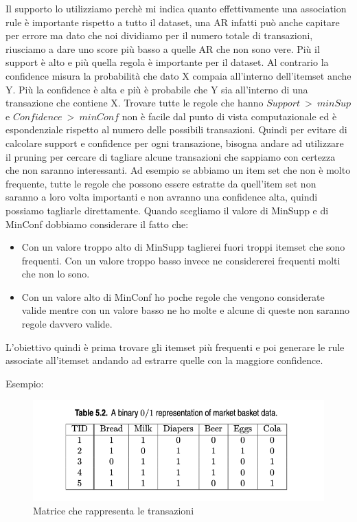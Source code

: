 \documentclass[14pt]{extreport}
\begin{document}
Il supporto lo utilizziamo perchè mi indica quanto effettivamente una association rule è importante rispetto a tutto il dataset, una AR infatti può anche capitare per errore ma dato che noi dividiamo per il numero totale di transazioni, riusciamo a dare uno score più basso a quelle AR che non sono vere. Più il support è alto e più quella regola è importante per il dataset.
Al contrario la confidence misura la probabilità che dato X compaia all'interno dell'itemset anche Y. Più la confidence è alta e più è probabile che Y sia all'interno di una transazione che contiene X.
Trovare tutte le regole che hanno $Support\ > \ minSup$ e $Confidence\ > \ minConf$ non è facile dal punto di vista computazionale ed è espondenziale rispetto al numero delle possibili transazioni.
Quindi per evitare di calcolare support e confidence per ogni transazione, bisogna andare ad utilizzare il pruning per cercare di tagliare alcune transazioni che sappiamo con certezza che non saranno interessanti. Ad esempio se abbiamo un item set che non è molto frequente, tutte le regole che possono essere estratte da quell'item set non saranno a loro volta importanti e non avranno una confidence alta, quindi possiamo tagliarle direttamente.
Quando scegliamo il valore di MinSupp e di MinConf dobbiamo considerare il fatto che:
\begin{itemize}
\item Con un valore troppo alto di MinSupp taglierei fuori troppi itemset che sono frequenti. Con un valore troppo basso invece ne considererei frequenti molti che non lo sono.
\item Con un valore alto di MinConf ho poche regole che vengono considerate valide mentre con un valore basso ne ho molte e alcune di queste non saranno regole davvero valide.
\end{itemize}

L'obiettivo quindi è prima trovare gli itemset più frequenti e poi generare le rule associate all'itemset andando ad estrarre quelle con la maggiore confidence.

Esempio:
\begin{figure}[h!]
  \includegraphics[width=\linewidth]{ConSup.png}
  \caption{Matrice che rappresenta le transazioni}
\end{figure}
\end{document}

